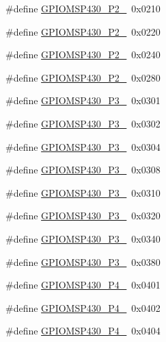 \begin{DoxyCompactItemize}
\item 
\#define \hyperlink{_g_p_i_o_m_s_p430_8h_a47e1a4e6634abe4bcaefe5a65b512fe5}{G\+P\+I\+O\+M\+S\+P430\+\_\+\+P2\+\_}~0x0210
\item 
\#define \hyperlink{_g_p_i_o_m_s_p430_8h_a56652eb75a0c9173314963ae73825818}{G\+P\+I\+O\+M\+S\+P430\+\_\+\+P2\+\_}~0x0220
\item 
\#define \hyperlink{_g_p_i_o_m_s_p430_8h_acb05b57531f8aee7acd1dcbb00fbb065}{G\+P\+I\+O\+M\+S\+P430\+\_\+\+P2\+\_}~0x0240
\item 
\#define \hyperlink{_g_p_i_o_m_s_p430_8h_a4a28ffe45316b64b3c8a31bd1e1354d8}{G\+P\+I\+O\+M\+S\+P430\+\_\+\+P2\+\_}~0x0280
\item 
\#define \hyperlink{_g_p_i_o_m_s_p430_8h_ae5a87166cc3abe510c5a677b2164e273}{G\+P\+I\+O\+M\+S\+P430\+\_\+\+P3\+\_}~0x0301
\item 
\#define \hyperlink{_g_p_i_o_m_s_p430_8h_a5adfed24fc5dbf08029244d894e89ac4}{G\+P\+I\+O\+M\+S\+P430\+\_\+\+P3\+\_}~0x0302
\item 
\#define \hyperlink{_g_p_i_o_m_s_p430_8h_ab0109144454202f57606f537ae8ee5c3}{G\+P\+I\+O\+M\+S\+P430\+\_\+\+P3\+\_}~0x0304
\item 
\#define \hyperlink{_g_p_i_o_m_s_p430_8h_a388c40efbfd0c355b2e7e64624816e4b}{G\+P\+I\+O\+M\+S\+P430\+\_\+\+P3\+\_}~0x0308
\item 
\#define \hyperlink{_g_p_i_o_m_s_p430_8h_a497970b5de7c4c973c97b3629b8044b2}{G\+P\+I\+O\+M\+S\+P430\+\_\+\+P3\+\_}~0x0310
\item 
\#define \hyperlink{_g_p_i_o_m_s_p430_8h_a01462e65affa19ebda7112df066a5899}{G\+P\+I\+O\+M\+S\+P430\+\_\+\+P3\+\_}~0x0320
\item 
\#define \hyperlink{_g_p_i_o_m_s_p430_8h_aa1e6b5a2c1783e779d55b1e7f32511c7}{G\+P\+I\+O\+M\+S\+P430\+\_\+\+P3\+\_}~0x0340
\item 
\#define \hyperlink{_g_p_i_o_m_s_p430_8h_a630e32c68a78aac5357814aa5ec453ff}{G\+P\+I\+O\+M\+S\+P430\+\_\+\+P3\+\_}~0x0380
\item 
\#define \hyperlink{_g_p_i_o_m_s_p430_8h_af598c201e8ad0bc318a1830683c964c8}{G\+P\+I\+O\+M\+S\+P430\+\_\+\+P4\+\_}~0x0401
\item 
\#define \hyperlink{_g_p_i_o_m_s_p430_8h_ab03f8c5fceeddea3fd6d016c91cfe900}{G\+P\+I\+O\+M\+S\+P430\+\_\+\+P4\+\_}~0x0402
\item 
\#define \hyperlink{_g_p_i_o_m_s_p430_8h_a92db727b0ee7b3e09019cd036127afe9}{G\+P\+I\+O\+M\+S\+P430\+\_\+\+P4\+\_}~0x0404
\item 

\end{DoxyCompactItemize}
